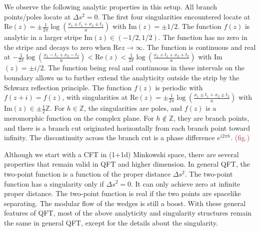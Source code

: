 \documentclass[a4paper,11pt]{article}
\theoremstyle{definition}
\newcommand{\KL}[1]{\textcolor{brown}{#1}}
\begin{document}
We observe the following analytic properties in this setup. All branch points/poles locate at $\Delta s^2 = 0$. The first four singularities encountered locate at Re$(z) = \pm\frac{1}{2\pi}\log(\frac{x_1\pm t_1+x_2\pm t_2}{a})$ with Im$(z) = \pm 1/2$. The function $f(z)$ is analytic in a larger stripe Im$(z)\in (-1/2,1/2)$. The function has no zero in the stripe and decays to zero when Re$z \to \infty$. The function is continuous and real at $-\frac{1}{2\pi}\log(\frac{x_1- t_1+x_2- t_2}{a})<\text{Re}(z)< \frac{1}{2\pi}\log(\frac{x_1+ t_1+x_2+ t_2}{a})$ with Im$(z) = \pm i/2$. The function being real and continuous in these intervals on the boundary allows us to further extend the analyticity outside the strip by the Schwarz reflection principle. The function $f(z)$ is periodic with $f(z+i) = f(z)$, with singularities at Re$(z) = \pm\frac{1}{2\pi}\log(\frac{x_1\pm t_1+x_2\pm t_2}{a})$ with Im$(z) \in \pm \frac{1}{2}\mathbb{Z}$. For $h \in \mathbb{Z}$, the singularities are poles, and $f(z)$ is a meromorphic function on the complex plane. For $h \notin \mathbb{Z}$, they are branch points, and there is a branch cut originated horizontally from each branch point toward infinity. The discontinuity across the branch cut is a phase difference $e^{i2\pi h}$.  \KL{(fig.)}

Although we start with a CFT in (1+1d) Minkowski space, there are several properties that remain valid in QFT and higher dimension. In general QFT, the two-point function is a function of the proper distance $\Delta s^2$. The two-point function has a singularity only if $\Delta s^2 = 0$. It can only achieve zero at infinite proper distance. The two-point function is real if the two points are spacelike separating. The modular flow of the wedges is still a boost. With these general features of QFT, most of the above analyticity and singularity structures remain the same in general QFT, except for the details about the singularity. 
\end{document}
